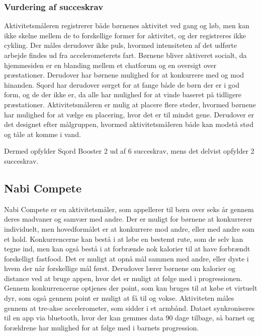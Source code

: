 \subsubsection{Vurdering af succeskrav}
Aktivitetsmåleren registrerer både børnenes aktivitet ved gang og løb, men kan ikke skelne mellem de to forskellige former for aktivitet, og der registreres ikke cykling. Der måles derudover ikke puls, hvormed intensiteten af det udførte arbejde findes ud fra accelerometerets fart. \newline
Børnene bliver aktiveret socialt, da hjemmesiden er en blanding mellem et chatforum og en oversigt over præstationer. Derudover har børnene mulighed for at konkurrere med og mod hinanden. Sqord har derudover sørget for at fange både de børn der er i god form, og de der ikke er, da alle har mulighed for at vinde baseret på tidligere præstationer. Aktivitetsmåleren er mulig at placere flere steder, hvormed børnene har mulighed for at vælge en placering, hvor det er til mindst gene. Derudover er det designet efter målgruppen, hvormed aktivitetsmåleren både kan modstå stød og tåle at komme i vand.  

Dermed opfylder Sqord Booster 2 ud af 6 succeskrav, mens det delvist opfylder 2 succeskrav.

\subsection{Nabi Compete}
Nabi Compete er en aktivitetsmåler, som appellerer til børn over seks år gennem deres madvaner og samvær med andre. Der er muligt for børnene at konkurrerer individuelt, men hovedformålet er at konkurrere mod andre, eller med andre som et hold. Konkurrencerne kan bestå i at løbe en bestemt rute, som de selv kan tegne ind, men kan også bestå i at forbrænde nok kalorier til at have forbrændt forskelligt fastfood. Det er muligt at opnå mål sammen med andre, eller dyste i hvem der når forskellige mål først. Derudover lærer børnene om kalorier og distance ved at bruge appen, hvor det er muligt at følge med i progressionen. Gennem konkurrencerne optjenes der point, som kan bruges til at købe et virtuelt dyr, som også gennem point er muligt at få til og vokse. 
Aktiviteten måles gennem at tre-akse accelerometer, som sidder i et armbånd. Dataet synkroniseres til en app via bluetooth, hvor der kan gemmes data 90 dage tilbage, så barnet og forældrene har mulighed for at følge med i barnets progression. 


